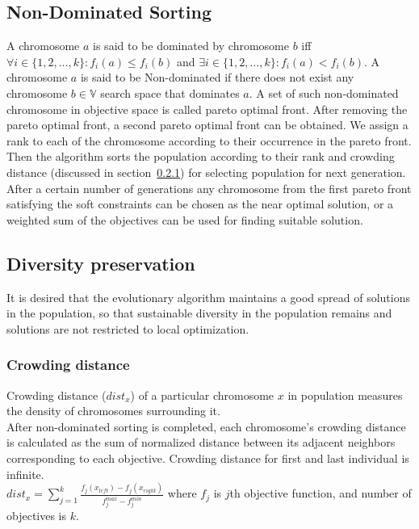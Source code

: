 \subsection{Non-Dominated Sorting}
\label{nds}
A chromosome $a$ is said to be dominated by chromosome $b$ iff $\forall i \in \{1,2,\ldots,k\}: f_i(a) \leq f_i(b)$ and $\exists i \in \{1,2,\ldots,k\}: f_i(a) < f_i(b)$.
A chromosome $a$ is said to be Non-dominated if there does not exist any chromosome $b\in \mathbb{V}$ search space that dominates $a$. A set of such non-dominated chromosome in objective space is called pareto optimal front. After removing the pareto optimal front, a second pareto optimal front can be obtained. We assign a rank to each of the chromosome according to their occurrence in the pareto front. Then the algorithm sorts the population according to their rank and crowding distance (discussed in section~\ref{cds}) for selecting population for next generation. After a certain number of generations any chromosome from the first pareto front satisfying the soft constraints  can be chosen as the near optimal solution, or a weighted sum of the objectives can be used for finding suitable solution.
\subsection{Diversity preservation}
It is desired that the evolutionary algorithm maintains a good spread of solutions in the population, so that sustainable diversity in the population remains and solutions are not restricted to local optimization.
\subsubsection{Crowding distance}
\label{cds}
Crowding distance ($dist_x$) of a particular chromosome $x$ in population measures the density of chromosomes surrounding it. \\
After non-dominated sorting is completed, each chromosome's crowding distance is calculated as the sum of normalized distance between its adjacent neighbors corresponding to each objective. Crowding distance for first and last individual is infinite.\\

$dist_x = \sum _{j=1}^{k}\frac{f_j(x_{left})-f_j(x_{right})}{f_j^{max} -f_j^{min}}$
where $f_j$ is $j$th objective function, and number of objectives is $k$.

